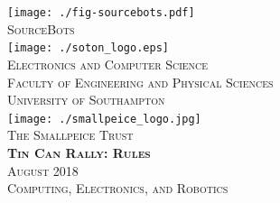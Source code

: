 \documentclass[twoside,12pt,a4paper,titlepage]{article}
\title{\gamename}
\author{\org}
\date{\timeline}
\newcommand{\gamename}{Tin Can Rally\xspace}
\newcommand{\timeline}{August 2018\xspace}
\begin{document}
\begin{titlepage}
\begin{center}
\texttt{[image: ./fig-sourcebots.pdf]}~\\[1cm]
\textsc{\large SourceBots}~\\[1.8cm]
\texttt{[image: ./soton\_logo.eps]}~\\[1cm]
\textsc{\large Electronics and Computer Science}\\[0.2cm]
\textsc{\large Faculty of Engineering and Physical Sciences}\\[0.2cm]
\textsc{\large University of Southampton}\\[1.8cm]
\texttt{[image: ./smallpeice\_logo.jpg]}~\\[0.2cm]
\textsc{\large The Smallpeice Trust}\\[1.8cm]
\textsc{\huge \textbf{\gamename{}: Rules}}\\[1cm]
\textsc{\large \timeline}\\[1.2cm]
\textsc{\Large Computing, Electronics, and Robotics}
\end{center}
\end{titlepage}


\clearpage

\clearpage

\end{document}
